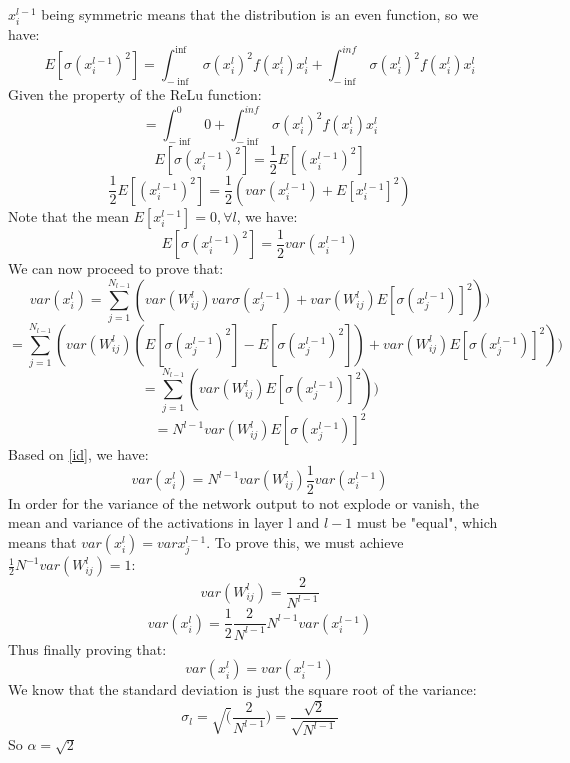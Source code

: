 $x_i^{l-1}$ being symmetric means that the distribution is an even function, so we have:
\begin{equation*}
	E[\sigma(x_i^{l-1})^2] = \int_{-\inf}^{\inf}\sigma(x_i^l)^2f(x_i^l)x_i^l + \int_{-\inf}^{inf}\sigma(x_i^l)^2f(x_i^l)x_i^l
\end{equation*}
Given the property of the ReLu function:
\begin{equation*}
	= \int_{-\inf}^{0}0 + \int_{-\inf}^{inf}\sigma(x_i^l)^2f(x_i^l)x_i^l
\end{equation*}
\begin{equation*}
	E[\sigma(x_i^{l-1})^2] = \frac{1}{2}E[(x_i^{l-1})^2] 
\end{equation*}
\begin{equation*}
	\frac{1}{2}E[(x_i^{l-1})^2] = \frac{1}{2}(var(x_i^{l-1}) + E[x_i^{l-1}]^2)
\end{equation*}
Note that the mean $E[x_i^{l-1}] = 0, \forall l$, we have:
\begin{equation}\label{id}
	E[\sigma(x_i^{l-1})^2] = \frac{1}{2}var(x_i^{l-1}) 
\end{equation}
We can now proceed to prove that:
\begin{equation*}
	var(x_i^l) = \sum_{j=1}^{N_{l-1}}(var(W_{ij}^l)var\sigma(x_j^{l-1}) + var(W_{ij}^l)E[\sigma(x_j^{l-1})]^2))
\end{equation*}
\begin{equation*}
	= \sum_{j=1}^{N_{l-1}}(var(W_{ij}^l)(E[\sigma(x_j^{l-1})^2] - E[\sigma(x_j^{l-1})^2])+ var(W_{ij}^l)E[\sigma(x_j^{l-1})]^2))
\end{equation*}
\begin{equation*}
	= \sum_{j=1}^{N_{l-1}}(var(W_{ij}^l)E[\sigma(x_j^{l-1})]^2))
\end{equation*}
\begin{equation*}
	= N^{l-1}var(W_{ij}^l)E[\sigma(x_j^{l-1})]^2
\end{equation*}
Based on \ref{id}, we have:
\begin{equation*}
	var(x_i^l) = N^{l-1}var(W_{ij}^l)\frac{1}{2}var(x_i^{l-1})
\end{equation*}
In order for the variance of the network output to not explode or vanish, the mean and variance of the activations in layer l  and $l-1$ must be "equal", which means that $var(x_i^l) = var{x_j^{l-1}}$. To prove this, we must achieve $\frac{1}{2}N^{-1}var(W_{ij}^{l}) = 1$:
\begin{equation*}
	var(W_{ij}^l) = \frac{2}{N^{l-1} }
\end{equation*}
\begin{equation*}
	var(x_i^l) = \frac{1}{2}\frac{2}{N^{l-1}}N^{l-1}var(x_i^{l-1})
\end{equation*}
Thus finally proving that:
\begin{equation*}
	var(x_i^l) = var(x_i^{l-1})
\end{equation*}
We know that the standard deviation is just the square root of the variance:
\begin{equation*}
	\sigma_l = \sqrt(\frac{2}{N^{l-1}}) = \frac{\sqrt2}{\sqrt{N^{l-1}}}
\end{equation*}
So $\alpha = \sqrt2$